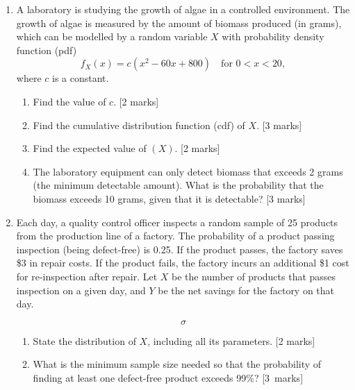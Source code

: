 \begin{enumerate}
\item A laboratory is studying the growth of algae in a controlled environment. The growth of algae is measured by the amount of biomass produced (in grams), which can be modelled by a random variable $X$ with probability density function (pdf)
\[
		f_X(x) = c \left(x^2 - 60x + 800\right)
		\quad \text{for } 0<x<20,
\]
where $c$ is a constant.


\begin{enumerate}
\item Find the value of $c$.
\hfill [2 marks]

%
\item Find the cumulative distribution function (cdf) of $X$.
\hfill [3 marks]

%
\item Find the expected value of $(X)$.
\hfill [2 marks]

%
\item The laboratory equipment can only detect biomass that exceeds 2 grams (the minimum detectable amount). What is the probability that the biomass exceeds 10 grams, given that it is detectable?
\hfill [3 marks]

\end{enumerate}

\vspace{0.5cm}

\item Each day, a quality control officer inspects a random sample of 25 products from the production line of a factory. The probability of a product passing inspection (being defect-free) is 0.25. If the product passes, the factory saves \$3 in repair costs. If the product fails, the factory incurs an additional \$1 cost for re-inspection after repair.
Let $X$ be the number of products that passes inspection on a given day, and $Y$ be the net savings for the factory on that day.

\[
\sigma
\]

\begin{enumerate}
\item State the distribution of $X$, including all its parameters.
	\hfill [2 marks]

%
\item What is the minimum sample size needed so that the probability of finding at least one defect-free product exceeds 99\%?
	\hfill [3~marks]


\end{enumerate}
\end{enumerate}
